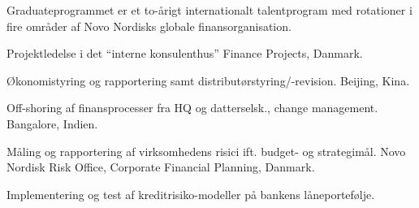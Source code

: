 \documentclass[a4paper]{janus-resume} %
\begin{document}
\begin{minipage}[t]{0.49\textwidth}
\sectionspace %



\begin{tightitemize}
\item Graduateprogrammet er et to-årigt internationalt talentprogram med rotationer i fire områder af Novo Nordisks globale finansorganisation.
\item Projektledelse i det ``interne konsulenthus'' Finance Projects, Danmark.
\item Økonomistyring og rapportering samt distributørstyring/-revision. Beijing, Kina.
\item Off-shoring af finansprocesser fra HQ og datterselsk., change management. Bangalore, Indien.
\item Måling og rapportering af virksomhedens risici ift. budget- og strategimål. Novo Nordisk Risk Office, Corporate Financial Planning, Danmark.
\end{tightitemize}

\sectionspace %


\begin{tightitemize}
\item Implementering og test af kreditrisiko-modeller på bankens låneportefølje. 
\end{tightitemize}

\sectionspace %


\sectionspace %




\end{minipage} %

\end{document}
